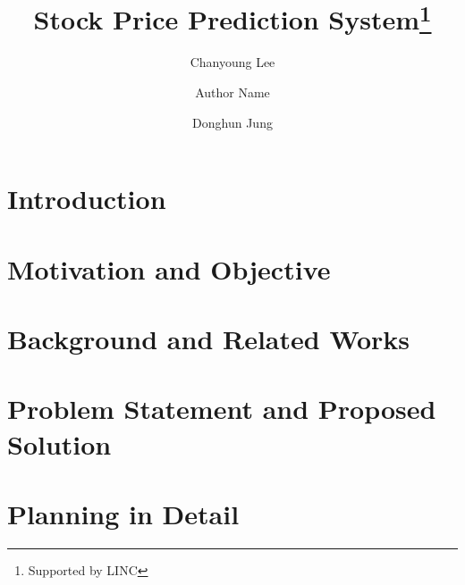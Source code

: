\documentclass[runningheads]{llncs}
\begin{document}
%
\title{Stock Price Prediction System\thanks{Supported by LINC}}
%
%
\author{Chanyoung Lee \and
Author Name \and
Donghun Jung}
%
%
%
\maketitle              %
%
\begin{abstract}

\end{abstract}
%
%
%
\section{Introduction}
\label{sec:Introduction}


\section{Motivation and Objective}
\label{sec:MotivationAndObjective}


\section{Background and Related Works}
\label{sec:BackgroundAndRelatedWorks}


\section{Problem Statement and Proposed Solution}
\label{sec:ProblemStatementAndProposedSolution}


\section{Planning in Detail}
\label{sec:PlanningInDetail}

\end{document}
